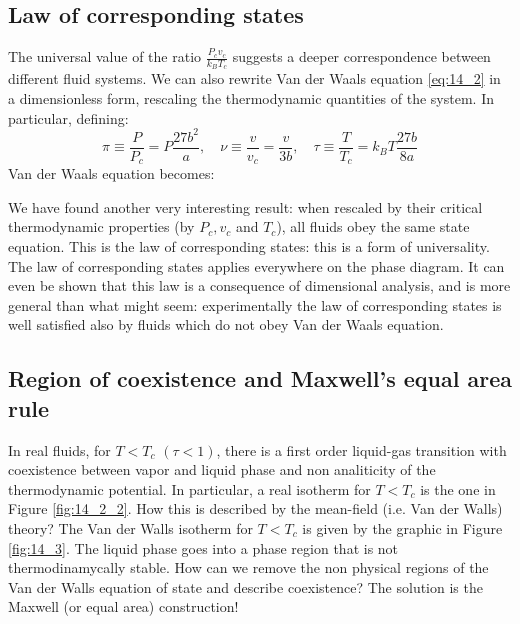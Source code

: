 \documentclass[../main/main.tex]{subfiles}
\begin{document}
\subsection{Law of corresponding states}
The universal value of the ratio \( \frac{P_c v_c}{k_B T_c} \) suggests a deeper correspondence between different fluid systems.
We can also rewrite Van der Waals equation \eqref{eq:14_2} in a dimensionless form, rescaling the thermodynamic quantities of the system. In particular, defining:
\begin{equation}
  \pi \equiv \frac{P}{P_c}= P\frac{27b^2}{a}, \quad \nu  \equiv \frac{v}{v_c} = \frac{v}{3b}, \quad \tau \equiv \frac{T}{T_c} = k_B T\frac{27b}{8a}
\end{equation}
Van der Waals equation becomes:
We have found another very interesting result: when rescaled by their critical thermodynamic properties (by \( P_c, v_c \) and \( T_c \)), all fluids obey the same state equation. This is the law of corresponding states: this is a form of universality. The law of corresponding states applies everywhere on the phase diagram. It can even be shown that this law is a consequence of dimensional analysis, and is more general than what might seem: experimentally the law of corresponding states is well satisfied also by fluids which do not obey Van der Waals equation.



\subsection{Region of coexistence and Maxwell's equal area rule}
In real fluids, for \( T < T_c \) \( (\tau < 1) \), there is a first order liquid-gas transition with coexistence between vapor and liquid phase and non analiticity of the thermodynamic potential. In particular, a real isotherm for \( T < T_c \) is the one in Figure \ref{fig:14_2_2}. How this is described by the mean-field (i.e. Van der Walls) theory?
The Van der Walls isotherm for \(T<T_c\) is given by the graphic in Figure \ref{fig:14_3}.
The liquid phase goes into a phase region that is not thermodinamycally stable.
How can we remove the non physical regions of the Van der Walls equation of state and describe coexistence? The solution is the Maxwell (or equal area) construction!
\end{document}
